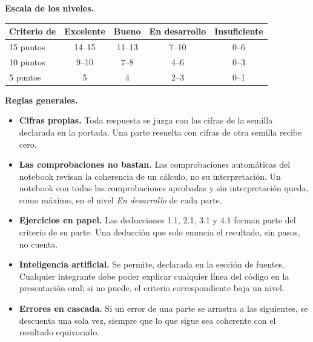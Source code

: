 \documentclass[10pt,letterpaper]{article}
\begin{document}
\textbf{Escala de los niveles.}
\begin{center}
\begin{tabular}{@{}lcccc@{}}
\toprule
Criterio de & Excelente & Bueno & En desarrollo & Insuficiente\\
\midrule
15 puntos & 14--15 & 11--13 & 7--10 & 0--6\\
10 puntos & 9--10 & 7--8 & 4--6 & 0--3\\
5 puntos & 5 & 4 & 2--3 & 0--1\\
\bottomrule
\end{tabular}
\end{center}

\textbf{Reglas generales.}
\begin{itemize}
  \item \textbf{Cifras propias.} Toda respuesta se juzga con las cifras de la semilla declarada en la portada. Una parte resuelta con cifras de otra semilla recibe cero.
  \item \textbf{Las comprobaciones no bastan.} Las comprobaciones automáticas del notebook revisan la coherencia de un cálculo, no su interpretación. Un notebook con todas las comprobaciones aprobadas y sin interpretación queda, como máximo, en el nivel \emph{En desarrollo} de cada parte.
  \item \textbf{Ejercicios en papel.} Las deducciones 1.1, 2.1, 3.1 y 4.1 forman parte del criterio de su parte. Una deducción que solo enuncia el resultado, sin pasos, no cuenta.
  \item \textbf{Inteligencia artificial.} Se permite, declarada en la sección de fuentes. Cualquier integrante debe poder explicar cualquier línea del código en la presentación oral; si no puede, el criterio correspondiente baja un nivel.
  \item \textbf{Errores en cascada.} Si un error de una parte se arrastra a las siguientes, se descuenta una sola vez, siempre que lo que sigue sea coherente con el resultado equivocado.
\end{itemize}
\end{document}
